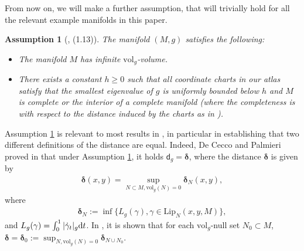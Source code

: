 \documentclass[a4paper,10pt]{article}
\newtheorem{assumption}[theorem]{Assumption}
\numberwithin{equation}{section}
\newcommand{\Lip}{\mathrm{Lip}}
\newcommand{\vol}{\mathrm{vol}}
\newcommand{\sfd}{\mathsf d}
\newcommand{\di}{{\rm d}}
\begin{document}
From now on, we will make a further assumption, that will trivially hold for all the relevant example manifolds in this paper. 

\smallskip
\begin{assumption}[\cite{de1991integral}, (1.13)]\label{assumption_on_mfd}
The manifold $(M,g)$ satisfies the following:
    \begin{itemize}
    \item[(i)] The manifold $M$ has infinite $\vol_g$-volume. 
    \item[(ii)] There exists a constant $h \geq 0$ such that all coordinate charts in our atlas satisfy that the smallest eigenvalue of $g$ is uniformly bounded below $h$ and $M$ is complete or the interior of a complete manifold (where the completeness is with respect to the distance induced by the charts as in \cite[(1.9)]{de1991integral}).
\end{itemize}
\end{assumption}

Assumption \ref{assumption_on_mfd} is relevant to most results in \cite{de1991integral}, in particular in establishing that two different definitions of the distance are equal. 
Indeed, De Cecco and Palmieri proved in \cite[Theorem (2.18) and Theorem (6.1)]{de1991integral}  that under Assumption \ref{assumption_on_mfd}, it holds $\sfd_g= \boldsymbol{\delta}$, where the distance $\boldsymbol{\delta}$ is given by 
 \begin{align}\label{null_set_def_of_metric}
    \boldsymbol{\delta}(x, y)= \sup_{N\subset M, \vol_g(N)=0} \boldsymbol{\delta}_N(x, y),
 \end{align}
where
 \begin{align}
     \boldsymbol{\delta}_N :=\inf\{L_g(\gamma), \gamma \in \Lip_N(x, y, M)\},
 \end{align}
 and $L_g(\gamma) = \int_0^1 |\dot{\gamma}_t|_g \di t$.
 In \cite[Theorem 4.4]{de1988distanza}, it is shown that for each $\vol_g$-null set $N_0 \subset M$, $\boldsymbol{\delta} = \boldsymbol{\delta}_0:= \sup_{N, \vol_g(N)=0} \boldsymbol{\delta}_{N \cup N_0}$. 
\smallskip
  
\end{document}
